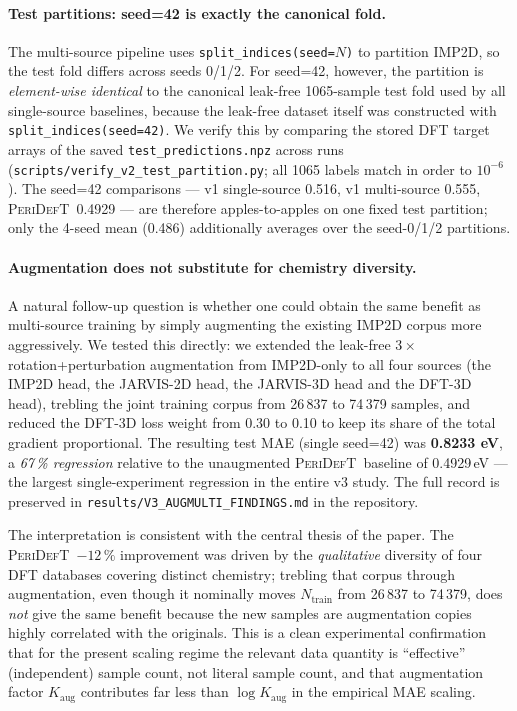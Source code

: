 \documentclass[11pt,a4paper]{article}
\newcommand{\modelname}{\textsc{PeriDefT}}
\begin{document}
\paragraph{Test partitions: seed=42 is exactly the canonical fold.}
The multi-source pipeline uses \texttt{split\_indices(seed=$N$)} to
partition IMP2D, so the test fold differs across seeds 0/1/2. For
seed=42, however, the partition is \emph{element-wise identical} to
the canonical leak-free 1065-sample test fold used by all
single-source baselines, because the leak-free dataset itself was
constructed with \texttt{split\_indices(seed=42)}. We verify this by
comparing the stored DFT target arrays of the saved
\texttt{test\_predictions.npz} across runs
(\texttt{scripts/verify\_v2\_test\_partition.py};
all 1065 labels match in order to $10^{-6}$). The seed=42 comparisons
--- v1 single-source 0.516, v1 multi-source 0.555, \modelname\
0.4929 --- are therefore apples-to-apples on one fixed test
partition; only the 4-seed mean (0.486) additionally averages over
the seed-0/1/2 partitions.

\paragraph{Augmentation does not substitute for chemistry diversity.}
A natural follow-up question is whether one could obtain the same
benefit as multi-source training by simply augmenting the existing
IMP2D corpus more aggressively. We tested this directly: we extended
the leak-free $3\times$ rotation+perturbation augmentation from
IMP2D-only to all four sources (the IMP2D head, the JARVIS-2D head,
the JARVIS-3D head and the DFT-3D head), trebling the joint training
corpus from 26\,837 to 74\,379 samples, and reduced the DFT-3D loss
weight from 0.30 to 0.10 to keep its share of the total gradient
proportional. The resulting test MAE (single seed=42) was
\textbf{0.8233 eV}, a \emph{67\,\% regression} relative to the
unaugmented \modelname\ baseline of 0.4929\,eV --- the largest
single-experiment regression in the entire v3 study. The full record
is preserved in \texttt{results/V3\_AUGMULTI\_FINDINGS.md} in the
repository.

The interpretation is consistent with the central thesis of the
paper. The \modelname\ $-12\,\%$ improvement was driven by the
\emph{qualitative} diversity of four DFT databases covering distinct
chemistry; trebling that corpus through augmentation, even though it
nominally moves $N_{\mathrm{train}}$ from 26\,837 to 74\,379, does
\emph{not} give the same benefit because the new samples are
augmentation copies highly correlated with the originals. This is a
clean experimental confirmation that for the present scaling regime
the relevant data quantity is ``effective'' (independent) sample
count, not literal sample count, and that augmentation
factor $K_{\mathrm{aug}}$ contributes far less than $\log K_{\mathrm{aug}}$
in the empirical MAE scaling.
\end{document}

